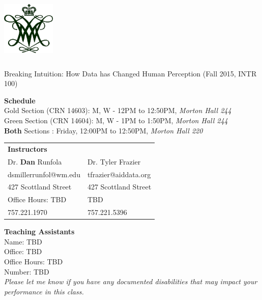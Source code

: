 \documentclass[11pt]{article}
\begin{document}
  \begin{center}

{\includegraphics[height=1.25in,width=1in]{wmchiffre1.jpg}} 

\LARGE Breaking Intuition: How Data has Changed Human Perception (Fall 2015, INTR 100)\\ \vspace{3mm}
\end{center}
\large \textbf{Schedule} \\
\normalsize \color{yellow}Gold \color{black} Section (CRN 14603): M, W - 12PM to 12:50PM, \textit{Morton Hall 244} \\
\color{green}Green \color{black} Section (CRN 14604): M, W - 1PM to 1:50PM, \textit{Morton Hall 244} \\
\textbf{Both} \color{black} Sections : Friday, 12:00PM to 12:50PM, \textit{Morton Hall 220} \\
\vspace{2mm}

\begin{table}[ht]
\begin{tabular}{l l}
\large \textbf{Instructors} & \\
\large Dr. \textbf{Dan} Runfola & Dr. Tyler Frazier \\
\large dsmillerrunfol@wm.edu  & tfrazier@aiddata.org \\
\large 427 Scottland Street & 427 Scottland Street \\
\large Office Hours: TBD & TBD \\
\large 757.221.1970 & 757.221.5396 \\
\end{tabular}
\end{table}


\large \textbf{Teaching Assistants} \\
\large Name: TBD  \\
\large Office: TBD \\
\large Office Hours: TBD \\
\large Number: TBD \\


\textit{Please let me know if you have any documented disabilities that may impact your performance in this class.}
\end{document}
